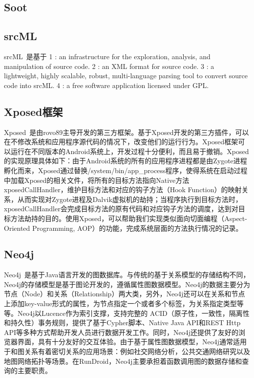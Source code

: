 \subsection{Soot}

\subsection{srcML}
srcML~\cite{collard2013srcml}是基于
1 : an infrastructure for the exploration, analysis, and manipulation of source code.
2 : an XML format for source code.
3 : a lightweight, highly scalable, robust, multi-language parsing tool to convert source code into srcML.
4 : a free software application licensed under GPL.


\subsection{Xposed框架}
Xposed~\cite{Xposed}是由rovo89主导开发的第三方框架。基于Xposed开发的第三方插件，可以在不修改系统和应用程序源代码的情况下，改变他们的运行行为。Xposed框架可以运行在不同版本的Android系统上，开发过程十分便利，而且易于撤销。Xposed的实现原理具体如下：由于Android系统的所有的应用程序进程都是由Zygote进程孵化而来，Xposed通过替换/system/bin/app\_process程序，使得系统在启动过程中加载Xposed的相关文件，将所有的目标方法指向Native方法xposedCallHandler，维护目标方法和对应的钩子方法（Hook Function）的映射关系，从而实现对Zygote进程及Dalvik虚拟机的劫持；当程序执行到目标方法时，xposedCallHandler会完成目标方法的原有代码和对应钩子方法的调度，达到对目标方法劫持的目的。使用Xposed，可以帮助我们实现类似面向切面编程（Aspect-Oriented Programming, AOP）的功能，完成系统层面的方法执行情况的记录。
\subsection{Neo4j}
Neo4j~\cite{Neo4jthe19}是基于Java语言开发的图数据库。与传统的基于关系模型的存储结构不同，Neo4j的存储模型是基于图论开发的，遵循属性图数据模型。Neo4j的数据主要分为节点（Node）和关系（Relationship）两大类，另外，Neo4j还可以在关系和节点上添加key-value形式的属性，为节点指定一个或者多个标签，为关系指定类型等等。Neo4j以Lucence作为索引支撑，支持完整的 ACID（原子性，一致性，隔离性和持久性）事务规则，提供了基于Cypher脚本、Native Java API和REST Http API等多种方式帮助开发人员进行数据开发工作。同时，Neo4j还提供了友好的浏览器界面，具有十分友好的交互体验。由于基于属性图数据模型，Neo4j通常适用于和图关系有着密切关系的应用场景：例如社交网络分析，公共交通网络研究以及地图网络拓扑等场景。在RunDroid，Neo4j主要承担着函数调用图的数据存储和查询的主要职责。


